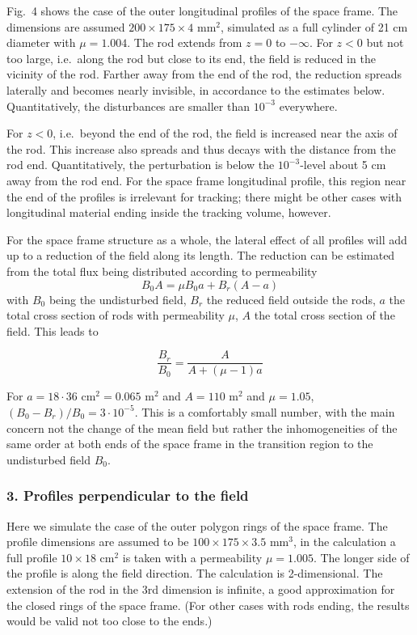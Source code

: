 \documentclass[12pt]{article}
\begin{document}
Fig.\ 4 shows the case of the outer longitudinal profiles of the space
frame. The dimensions are assumed $200\times 175\times 4$ mm$^2$,
simulated as a full cylinder of 21 cm diameter with $\mu=1.004$.  The
rod extends from $z=0$ to $-\infty$.  For $z<0$ but not too large,
i.e.\ along the rod but close to its end, the field is reduced in the
vicinity of the rod. Farther away from the end of the rod, the reduction
spreads laterally and becomes nearly invisible, in accordance to the
estimates below. Quantitatively, the disturbances are smaller than
$10^{-3}$ everywhere.


For $z<0$, i.e.\ beyond the end of the rod, the field is increased near
the axis of the rod. This increase also spreads and thus decays with the
distance from the rod end. Quantitatively, the perturbation is below the
$10^{-3}$-level about 5 cm away from the rod end.  For the space frame
longitudinal profile, this region near the end of the profiles is
irrelevant for tracking; there might be other cases with longitudinal
material ending inside the tracking volume, however.

 For the space frame structure as a whole, the lateral effect of all
profiles will add up to a reduction of the field along its length. The
reduction can be estimated from the total flux being distributed
according to permeability
\[ B_0  A = \mu B_0 a + B_r (A-a) \] 
with $B_0$ being the undisturbed field, $B_r$ the reduced field
outside the rods, $a$ the total cross section of rods with
permeability $\mu$, $A$ the total cross section of the field. This
leads to

\[ \frac{B_r}{B_0} = \frac{A}{A + (\mu-1)a} \]

For $a = 18\cdot 36$ cm$^2 = 0.065$ m$^2$ and $A= 110$ m$^2$ and
$\mu = 1.05$, $(B_0 - B_r)/B_0 = 3\cdot 10^{-5}$.  This is a comfortably small number, with the main concern 
not the change of the mean field but rather the inhomogeneities of
the same order at both ends of the space frame in the transition region to the
undisturbed field $B_0$.


\subsubsection*{3. Profiles perpendicular to the field}

Here we simulate the case of the outer polygon rings of the space frame.
The profile dimensions are assumed to be $100\times 175\times 3.5$
mm$^3$, in the calculation a full profile $10\times 18$ cm$^2$ is taken
with a permeability $\mu=1.005$. The longer side of the profile is along
the field direction. The calculation is 2-dimensional. The
extension of the rod in the 3rd dimension is infinite, a good
approximation for the closed rings of the space frame.  (For other cases
with rods ending, the results would be valid not too close to the ends.)
\end{document}
